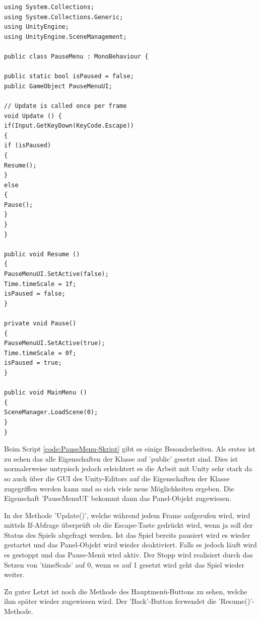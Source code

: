 \begin{lstlisting}[language={[Sharp]C}, caption=PauseMenu-Skript, label=code:PauseMenu-Skript]
using System.Collections;
using System.Collections.Generic;
using UnityEngine;
using UnityEngine.SceneManagement;

public class PauseMenu : MonoBehaviour {

public static bool isPaused = false;
public GameObject PauseMenuUI;

// Update is called once per frame
void Update () {
if(Input.GetKeyDown(KeyCode.Escape))
{
if (isPaused)
{
Resume();
}
else
{
Pause();
}
}
}

public void Resume ()
{
PauseMenuUI.SetActive(false);
Time.timeScale = 1f;
isPaused = false;
}

private void Pause()
{
PauseMenuUI.SetActive(true);
Time.timeScale = 0f;
isPaused = true;
}

public void MainMenu ()
{
SceneManager.LoadScene(0);
}
}
\end{lstlisting}
Beim Script \cref{code:PauseMenu-Skript} gibt es einige Besonderheiten. Als erstes ist zu sehen das alle Eigenschaften der Klasse auf 'public' gesetzt sind. Dies ist normalerweise untypisch jedoch erleichtert es die Arbeit mit Unity sehr stark da so auch über die GUI des Unity-Editors auf die Eigenschaften der Klasse zugegriffen werden kann und so sich viele neue Möglichkeiten ergeben. Die Eigenschaft 'PauseMenuUI' bekommt dann das Panel-Objekt zugewiesen.

In der Methode 'Update()', welche während jedem Frame aufgerufen wird, wird mittels If-Abfrage überprüft ob die Escape-Taste gedrückt wird, wenn ja soll der Status des Spiels abgefragt werden. Ist das Spiel bereits pausiert wird es wieder gestartet und das Panel-Objekt wird wieder deaktiviert. Falls es jedoch läuft wird es gestoppt und das Pause-Menü wird aktiv. Der Stopp wird realisiert durch das Setzen von 'timeScale' auf 0, wenn es auf 1 gesetzt wird geht das Spiel wieder weiter.

Zu guter Letzt ist noch die Methode des Hauptmenü-Buttons zu sehen, welche ihm später wieder zugewiesen wird. Der 'Back'-Button ferwendet die 'Resume()'-Methode.

